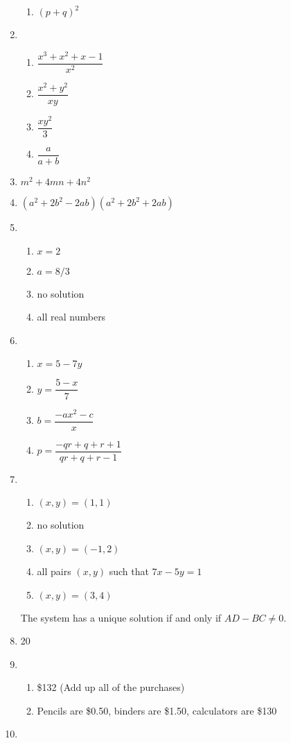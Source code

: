 \documentclass{article}
\begin{document}
\begin{multicols}{2}
\begin{enumerate}
\begin{enumerate}
\item $(p + q)^2$
\end{enumerate}
\item \begin{enumerate}
\item $\dfrac{x^3 + x^2 + x - 1}{x^2}$
\item $\dfrac{x^2 + y^2}{xy}$
\item $\dfrac{xy^2}{3}$
\item $\dfrac{a}{a + b}$
\end{enumerate}
\item $m^2 + 4mn + 4n^2$
\item $(a^2 + 2b^2 - 2ab)(a^2 + 2b^2 + 2ab)$
\item \begin{enumerate}
\item $x = 2$
\item $a = 8/3$
\item no solution
\item all real numbers
\end{enumerate}
\item \begin{enumerate}
\item $x = 5 - 7y$
\item $y = \dfrac{5 - x}{7}$
\item $b = \dfrac{-ax^2 - c}{x}$
\item $p = \dfrac{-qr + q + r + 1}{qr + q + r - 1}$
\end{enumerate}
\item \begin{enumerate}
\item $(x,y) = (1,1)$
\item no solution
\item $(x,y) = (-1,2)$
\item all pairs $(x,y)$ such that $7x - 5y = 1$
\item $(x,y) = (3,4)$
\end{enumerate}
The system has a unique solution if and only if $AD - BC\neq 0$.
\item 20
\item \begin{enumerate}
\item \$132 (Add up all of the purchases)
\item Pencils are \$0.50, binders are \$1.50, calculators are \$130
\end{enumerate}
\item \begin{enumerate}

\end{enumerate}
\end{enumerate}
\end{multicols}
\end{document}

